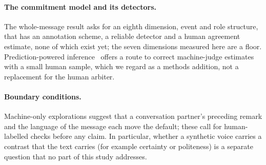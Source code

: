 \paragraph{The commitment model and its detectors.}
The whole-message result asks for an eighth dimension, event and role structure, that has an annotation scheme, a reliable detector and a human agreement estimate, none of which exist yet; the seven dimensions measured here are a floor.
Prediction-powered inference~\cite{angelopoulos2023ppi} offers a route to correct machine-judge estimates with a small human sample, which we regard as a methods addition, not a replacement for the human arbiter.

\paragraph{Boundary conditions.}
Machine-only explorations suggest that a conversation partner's preceding remark and the language of the message each move the default; these call for human-labelled checks before any claim.
In particular, whether a synthetic voice carries a contrast that the text carries (for example certainty or politeness) is a separate question that no part of this study addresses.
